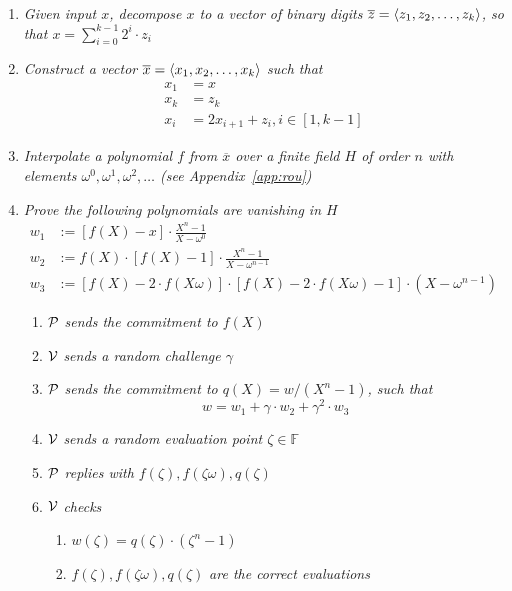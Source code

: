 \begin{enumerate}
    \item \textit{Given input $x$, decompose $x$ to a vector of binary digits $\overline{z}=\left \langle z_1,z_2,\dots,z_k \right \rangle$, so that $x=\sum_{i=0}^{k-1}2^i\cdot{z_i}$} 
    \item \textit{Construct a vector $\overline{x}=\left \langle x_1,x_2,\dots,x_k \right \rangle$ such that}
    \begin{align*}
        x_1&=x \\
        x_k&=z_k \\
        x_i&=2x_{i+1}+z_i,i\in[1,k-1]
    \end{align*}
    \item \textit{Interpolate a polynomial $f$ from $\overline{x}$ over a finite field $H$ of order $n$ with elements $\omega^0,\omega^1,\omega^2,\ldots$ (see Appendix~\ref{app:rou})} 
    \item \textit{Prove the following polynomials are vanishing in $H$}
    \begin{align*}
        w_1&:=[f(X)-x]\cdot\frac{X^n-1}{X-\omega^0} \\
        w_2&:=f(X)\cdot[f(X)-1]\cdot\frac{X^n-1}{X-\omega^{n-1}} \\
        w_3&:=[f(X)-2\cdot{f(X\omega)}]\cdot[f(X)-2\cdot{f(X\omega)}-1]\cdot(X-\omega^{n-1})
    \end{align*}
    \begin{enumerate}
        \item $\mathcal{P}$ \textit{sends the commitment to $f(X)$}
        \item $\mathcal{V}$ \textit{sends a random challenge $\gamma$}
        \item $\mathcal{P}$ \textit{sends the commitment to $q(X)=w/(X^n-1)$, such that}
        \[ w=w_1+\gamma\cdot{w_2}+\gamma^2\cdot{w_3} \]
        \item $\mathcal{V}$ \textit{sends a random evaluation point $\zeta\in\mathbb{F}$}
        \item $\mathcal{P}$ \textit{replies with $f(\zeta),f(\zeta\omega),q(\zeta)$}
        \item $\mathcal{V}$ \textit{checks}
        \begin{enumerate}
            \item $w(\zeta)=q(\zeta)\cdot(\zeta^n-1)$
            \item $f(\zeta),f(\zeta\omega),q(\zeta)$ \textit{are the correct evaluations}
        \end{enumerate}
    \end{enumerate}
\end{enumerate}

